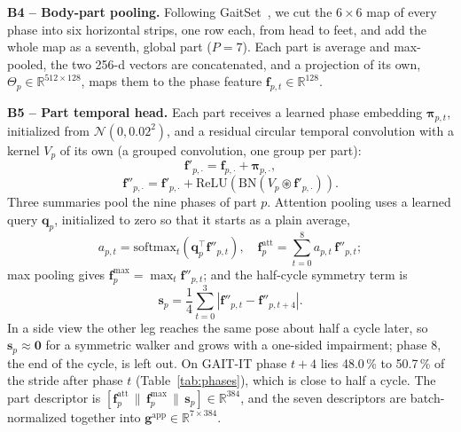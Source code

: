 \documentclass[conference]{IEEEtran}
\begin{document}
\textbf{B4 -- Body-part pooling.} Following GaitSet~\cite{gaitset}, we cut the $6\times6$ map of every phase into six horizontal strips, one row each, from head to feet, and add the whole map as a seventh, global part ($P=7$). Each part is average and max-pooled, the two 256-d vectors are concatenated, and a projection of its own, $\Theta_p\in\mathbb{R}^{512\times128}$, maps them to the phase feature $\mathbf{f}_{p,t}\in\mathbb{R}^{128}$.

\textbf{B5 -- Part temporal head.} Each part receives a learned phase embedding $\boldsymbol{\pi}_{p,t}$, initialized from $\mathcal{N}(0,0.02^2)$, and a residual circular temporal convolution with a kernel $V_p$ of its own (a grouped convolution, one group per part):
\begin{equation}
\mathbf{f}'_{p,\cdot}=\mathbf{f}_{p,\cdot}+\boldsymbol{\pi}_{p,\cdot},
\end{equation}
\begin{equation}
\mathbf{f}''_{p,\cdot}=\mathbf{f}'_{p,\cdot}+\mathrm{ReLU}\left(\mathrm{BN}(V_p\circledast\mathbf{f}'_{p,\cdot})\right).
\label{eq:part}
\end{equation}
Three summaries pool the nine phases of part $p$. Attention pooling uses a learned query $\mathbf{q}_p$, initialized to zero so that it starts as a plain average,
\begin{equation}
a_{p,t}=\mathrm{softmax}_t\left(\mathbf{q}_p^{\top}\mathbf{f}''_{p,t}\right),\quad \mathbf{f}^{\mathrm{att}}_p=\sum_{t=0}^{8}a_{p,t}\,\mathbf{f}''_{p,t};
\label{eq:att}
\end{equation}
max pooling gives $\mathbf{f}^{\max}_p=\max_t\mathbf{f}''_{p,t}$; and the half-cycle symmetry term is
\begin{equation}
\mathbf{s}_p=\frac{1}{4}\sum_{t=0}^{3}\left|\mathbf{f}''_{p,t}-\mathbf{f}''_{p,t+4}\right|.
\label{eq:sym}
\end{equation}
In a side view the other leg reaches the same pose about half a cycle later, so $\mathbf{s}_p\approx\mathbf{0}$ for a symmetric walker and grows with a one-sided impairment; phase 8, the end of the cycle, is left out. On GAIT-IT phase $t+4$ lies 48.0\,\% to 50.7\,\% of the stride after phase $t$ (Table~\ref{tab:phases}), which is close to half a cycle. The part descriptor is $[\mathbf{f}^{\mathrm{att}}_p\,\|\,\mathbf{f}^{\max}_p\,\|\,\mathbf{s}_p]\in\mathbb{R}^{384}$, and the seven descriptors are batch-normalized together into $\mathbf{g}^{\mathrm{app}}\in\mathbb{R}^{7\times384}$.
\end{document}
